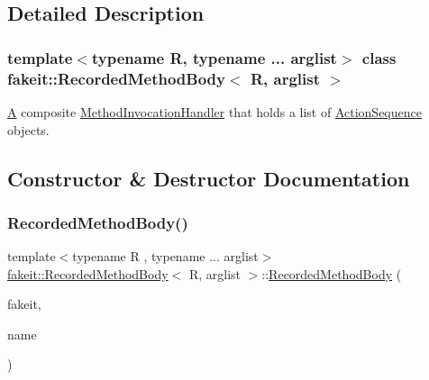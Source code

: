 \subsection{Detailed Description}
\subsubsection*{template$<$typename R, typename ... arglist$>$\newline
class fakeit\+::\+Recorded\+Method\+Body$<$ R, arglist $>$}

\mbox{\hyperlink{structA}{A}} composite \mbox{\hyperlink{structfakeit_1_1MethodInvocationHandler}{Method\+Invocation\+Handler}} that holds a list of \mbox{\hyperlink{structfakeit_1_1ActionSequence}{Action\+Sequence}} objects. 

\subsection{Constructor \& Destructor Documentation}
\mbox{\label{classfakeit_1_1RecordedMethodBody_af3668148275c0c7d1e22880218314eea}} 
\subsubsection{\texorpdfstring{RecordedMethodBody()}{RecordedMethodBody()}\hspace{0.1cm}{\footnotesize\ttfamily [1/9]}}
{\footnotesize\ttfamily template$<$typename R , typename ... arglist$>$ \\
\mbox{\hyperlink{classfakeit_1_1RecordedMethodBody}{fakeit\+::\+Recorded\+Method\+Body}}$<$ R, arglist $>$\+::\mbox{\hyperlink{classfakeit_1_1RecordedMethodBody}{Recorded\+Method\+Body}} (\begin{DoxyParamCaption}\item[{\mbox{\hyperlink{structfakeit_1_1FakeitContext}{Fakeit\+Context}} \&}]{fakeit,  }\item[{std\+::string}]{name }\end{DoxyParamCaption})\hspace{0.3cm}{\ttfamily [inline]}}

\mbox{\label{classfakeit_1_1RecordedMethodBody_a1afe57f937f8c6161774ae762f36b6d0}} 
